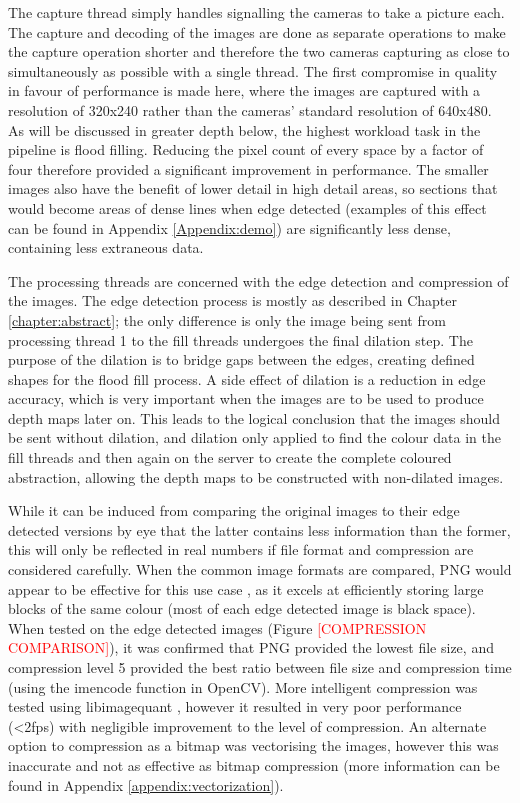 The capture thread simply handles signalling the cameras to take a picture each. The capture and decoding of the images are done as separate operations to make the capture operation shorter and therefore the two cameras capturing as close to simultaneously as possible with a single thread. The first compromise in quality in favour of performance is made here, where the images are captured with a resolution of 320x240 rather than the cameras' standard resolution of 640x480. As will be discussed in greater depth below, the highest workload task in the pipeline is flood filling. Reducing the pixel count of every space by a factor of four therefore provided a significant improvement in performance. The smaller images also have the benefit of lower detail in high detail areas, so sections that would become areas of dense lines when edge detected (examples of this effect can be found in Appendix \ref{Appendix:demo}) are significantly less dense, containing less extraneous data.

The processing threads are concerned with the edge detection and compression of the images. The edge detection process is mostly as described in Chapter \ref{chapter:abstract}; the only difference is only the image being sent from processing thread 1 to the fill threads undergoes the final dilation step. The purpose of the dilation is to bridge gaps between the edges, creating defined shapes for the flood fill process. A side effect of dilation is a reduction in edge accuracy, which is very important when the images are to be used to produce depth maps later on. This leads to the logical conclusion that the images should be sent without dilation, and dilation only applied to find the colour data in the fill threads and then again on the server to create the complete coloured abstraction, allowing the depth maps to be constructed with non-dilated images. 

While it can be induced from comparing the original images to their edge detected versions by eye that the latter contains less information than the former, this will only be reflected in real numbers if file format and compression are considered carefully. When the common image formats are compared, PNG would appear to be effective for this use case \cite{aguilera2006comparison}, as it excels at efficiently storing large blocks of the same colour (most of each edge detected image is black space). When tested on the edge detected images (Figure \textcolor{red}{[COMPRESSION COMPARISON]}), it was confirmed that PNG provided the lowest file size, and compression level 5 provided the best ratio between file size and compression time (using the imencode function in OpenCV). More intelligent compression was tested using libimagequant \cite{libimagequant}, however it resulted in very poor performance (\textless2fps) with negligible improvement to the level of compression. An alternate option to compression as a bitmap was vectorising the images, however this was inaccurate and not as effective as bitmap compression (more information can be found in Appendix \ref{appendix:vectorization}).

